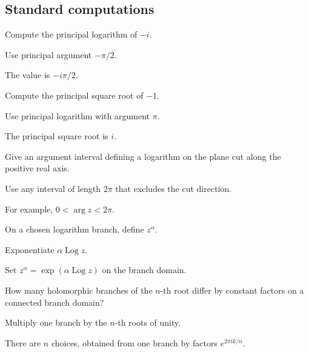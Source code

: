 \subsection*{Standard computations}

\begin{exercise}\label{exr:iv14-expand-01}
Compute the principal logarithm of \(-i\).
\end{exercise}
\begin{hint}
Use principal argument \(-\pi/2\).
\end{hint}
\begin{solution}
The value is \(-i\pi/2\).
\end{solution}

\begin{exercise}\label{exr:iv14-expand-02}
Compute the principal square root of \(-1\).
\end{exercise}
\begin{hint}
Use principal logarithm with argument \(\pi\).
\end{hint}
\begin{solution}
The principal square root is \(i\).
\end{solution}

\begin{exercise}\label{exr:iv14-expand-03}
Give an argument interval defining a logarithm on the plane cut along the positive real axis.
\end{exercise}
\begin{hint}
Use any interval of length \(2\pi\) that excludes the cut direction.
\end{hint}
\begin{solution}
For example, \(0<\arg z<2\pi\).
\end{solution}

\begin{exercise}\label{exr:iv14-expand-04}
On a chosen logarithm branch, define \(z^\alpha\).
\end{exercise}
\begin{hint}
Exponentiate \(\alpha\operatorname{Log}z\).
\end{hint}
\begin{solution}
Set \(z^\alpha=\exp(\alpha\operatorname{Log}z)\) on the branch domain.
\end{solution}

\begin{exercise}\label{exr:iv14-expand-05}
How many holomorphic branches of the \(n\)-th root differ by constant factors on a connected branch domain?
\end{exercise}
\begin{hint}
Multiply one branch by the \(n\)-th roots of unity.
\end{hint}
\begin{solution}
There are \(n\) choices, obtained from one branch by factors \(e^{2\pi i k/n}\).
\end{solution}

